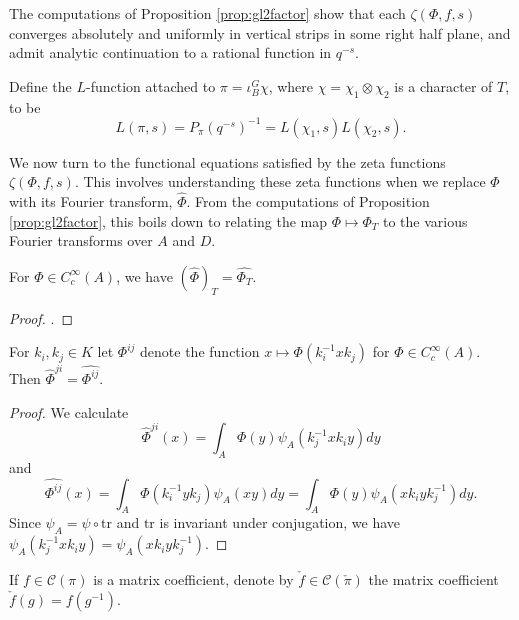 \begin{rem}
    The computations of Proposition \ref{prop:gl2factor} show that each $\zeta(\Phi,f,s)$ converges absolutely and uniformly in vertical strips in some right half plane, and admit analytic continuation to a rational function in $q^{-s}$.
\end{rem}


\begin{defn}
    Define the $L$-function attached to $\pi = \iota_B^G \chi$, where $\chi=\chi_1\otimes \chi_2$ is a character of $T$, to be $$L(\pi,s) = P_\pi(q^{-s})^{-1} = L(\chi_1,s)L(\chi_2,s).$$
\end{defn}

We now turn to the functional equations satisfied by the zeta functions $\zeta(\Phi,f,s)$. This involves understanding these zeta functions when we replace $\Phi$ with its Fourier transform, $\hat{\Phi}$. From the computations of Proposition \ref{prop:gl2factor}, this boils down to relating the map $\Phi \mapsto \Phi_T$ to the various Fourier transforms over $A$ and $D$.

\begin{lemma}
    For $\Phi \in C_c^\infty(A)$, we have $(\hat{\Phi})_T = \widehat{\Phi_T}$.
\end{lemma}
\begin{proof}
    \cite[Lemma 26.3]{BH1}.
\end{proof}

\begin{lemma}\label{hat}
    For $k_i,k_j \in K$ let $\Phi^{ij}$ denote the function $x \mapsto \Phi(k_i^{-1}xk_j)$ for $\Phi \in C_c^\infty(A)$. Then $\hat\Phi^{ji} = \widehat{\Phi^{ij}}$. 
\end{lemma}
\begin{proof}
    We calculate 
    $$\hat\Phi^{ji}(x) = \int_A \Phi(y)\psi_A(k_j^{-1}xk_iy)dy$$
    and 
    $$\widehat{\Phi^{ij}}(x) = \int_A\Phi(k_i^{-1}yk_j)\psi_A(xy)dy = \int_A \Phi(y)\psi_A(xk_iyk_j^{-1})dy.$$
    Since $\psi_A = \psi \circ \mathrm{tr}$ and $\mathrm{tr}$ is invariant under conjugation, we have $\psi_A(k_j^{-1}xk_iy) = \psi_A(xk_iyk_j^{-1})$.
\end{proof}

\begin{notn}
    If $f \in \mathcal C(\pi)$ is a matrix coefficient, denote by $\check{f} \in \mathcal C(\check\pi)$ the matrix coefficient
    $\check{f}(g) = f(g^{-1})$.
\end{notn}

